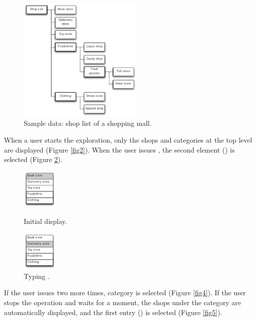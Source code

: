 \documentclass[conference]{IEEEtran}
\def\down{\tsf{▼}}
\begin{document}
\begin{figure}[H]
  \centerline{\includegraphics[width=60mm,bb=0 0 490 490]{figures/fig1.pdf}}
  \caption{Sample data: shop list of a shopping mall.}
  \label{fig1}
\end{figure}

When a user starts the exploration, only the shops and categories
at the top level are displayed (Figure \ref{fig2}).
When the user issues {\down},
the second element () is selected (Figure \ref{fig3}).

\def\menuwidth{22mm}

\begin{figure}[H]
  \begin{minipage}{0.45\hsize}
    \centerline{\includegraphics[width=17mm, bb=0 0 139 157]{figures/fig2.pdf}}
    \caption{Initial display.}
    \label{fig2}
  \end{minipage}
  \begin{minipage}{0.45\hsize}
    \centerline{\includegraphics[width=17mm,bb=0 0 139 157]{figures/fig3.pdf}}
    \caption{Typing {\down}.}
    \label{fig3}
  \end{minipage}
\end{figure}

If the user issues {\down} two more times, 
 category is selected (Figure \ref{fig4}).
If the user stops the operation and waits for a moment, the shops under the 
category are automatically displayed,
and the first entry () is selected (Figure \ref{fig5}).
\end{document}
